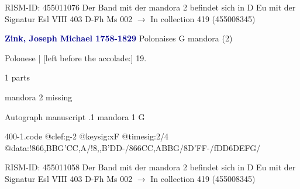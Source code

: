 \documentclass[twocolumn]{book}
\begin{document}
\newline RISM-ID: 455011076
\newline Der Band mit der mandora 2 befindet sich in D Eu mit der Signatur Esl VIII 403
\newline D-Fh  Ms 002
\newline $\rightarrow$ In collection 419 (455008345)

\newline \par \vspace{7pt} \textcolor{darkblue}{\textbf{Zink, Joseph Michael  1758-1829}}
\newline Polonaises  G  
\newline mandora (2)
\newline \begin{itshape}[f.13v, at left:] Polonese | [left before the accolade:] 19.\end{itshape} 
\newline \textcolor{darkblue}{}  1 parts  
\newline \begin{small} mandora 2 missing\end{small} 
\newline Autograph manuscript
.1  mandora 1  G  
\begin{filecontents*}{400-1.code}
@clef:g-2
@keysig:xF
@timesig:2/4
@data:!866{,BBG}{'CC,A}/!8,,B'DD-/866{CC,A}{BBG}/8D'FF-/fDD6DEFG/
\end{filecontents*}
\newline
%

\newline RISM-ID: 455011058
\newline Der Band mit der mandora 2 befindet sich in D Eu mit der Signatur Esl VIII 403
\newline D-Fh  Ms 002
\newline $\rightarrow$ In collection 419 (455008345)
\end{document}
